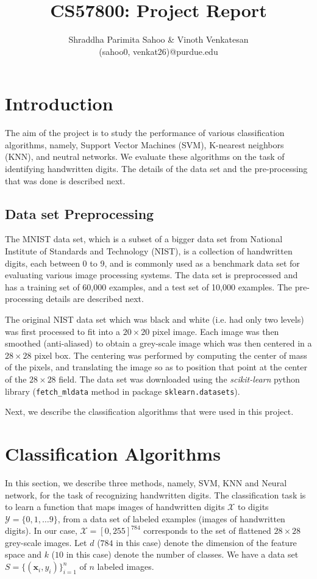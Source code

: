\documentclass[10pt]{scrartcl}
\title{CS57800: Project Report}
\author{Shraddha Parimita Sahoo \& Vinoth Venkatesan \\ (sahoo0, venkat26)@purdue.edu} %
\date{}
\newcommand{\vx}{\mathbf{x}}                        %
\begin{document}
\maketitle
\pagebreak
\tableofcontents
\pagebreak
{}
\section*{Introduction} 
The aim of the project is to study the performance of various classification algorithms, namely, Support Vector Machines (SVM), K-nearest neighbors (KNN), and neutral networks. We evaluate these algorithms on the task of identifying handwritten digits.  The details of the data set and the pre-processing that was done
is described next.

\subsection*{Data set Preprocessing}
The MNIST data set, which is a subset of a bigger data set from National Institute of Standards and Technology (NIST),
is a collection of handwritten digits, each between 0 to 9, and is commonly used as a benchmark data set for evaluating various image processing systems.
The data set is preprocessed and has a training set of 60,000 examples, and a test set of 10,000 examples. The pre-processing details are described next.

The original NIST data set which was black and white (i.e. had only two levels) was first processed to fit into a $20 \times 20$ pixel image. 
Each image was then smoothed (anti-aliased) to obtain a grey-scale image which was then centered in a $28 \times 28$ pixel box.
The centering was performed by computing the center of mass of the pixels, and translating the image so as to position that point at the center of the $28 \times 28$ field. 
The data set was downloaded using the \emph{scikit-learn} python library (\texttt{fetch\_mldata} method in package \texttt{sklearn.datasets}).

Next, we describe the classification algorithms that were used in this project.

\section*{Classification Algorithms}
In this section, we describe three methods, namely, SVM, KNN and Neural network, for the task of recognizing handwritten digits. The classification
task is to learn a function that maps images of handwritten digits $\mathcal{X}$ to digits $\mathcal{Y} = \{0, 1, \ldots 9\}$,
from a data set of labeled examples (images of handwritten digits).
In our case, $\mathcal{X} = [0, 255]^{784}$ corresponds to the set of flattened $28 \times 28$ grey-scale images. 
Let $d$ ($784$ in this case) denote the dimension of the feature space and $k$ ($10$ in this case) denote the number of classes.
We have a data set $S = \{ (\vx_i, y_i)  \}_{i=1}^n$ of $n$ labeled images. 
\end{document}
